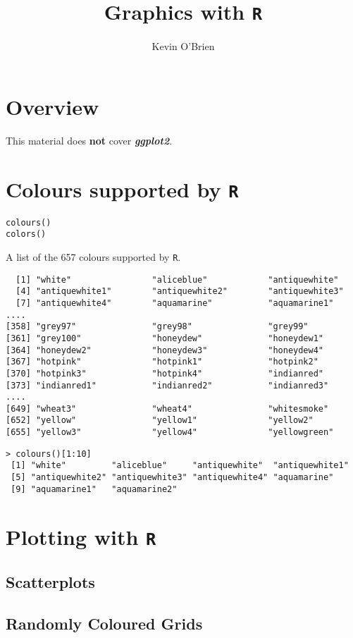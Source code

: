 \documentclass[11pt]{article} %
\title{Graphics with \texttt{R}}
\author{Kevin O'Brien}
\begin{document}
\section{Overview}
This material does \textbf{not} cover \textbf{\textit{ggplot2}}.
\section{Colours supported by \texttt{R}}
\begin{framed}
\begin{verbatim}
colours()
colors()
\end{verbatim}
\end{framed}
A list of the 657 colours supported by \texttt{R}.
\begin{verbatim}
  [1] "white"                "aliceblue"            "antiquewhite"        
  [4] "antiquewhite1"        "antiquewhite2"        "antiquewhite3"       
  [7] "antiquewhite4"        "aquamarine"           "aquamarine1"    
....
[358] "grey97"               "grey98"               "grey99"              
[361] "grey100"              "honeydew"             "honeydew1"           
[364] "honeydew2"            "honeydew3"            "honeydew4"           
[367] "hotpink"              "hotpink1"             "hotpink2"            
[370] "hotpink3"             "hotpink4"             "indianred"           
[373] "indianred1"           "indianred2"           "indianred3"                   
....
[649] "wheat3"               "wheat4"               "whitesmoke"          
[652] "yellow"               "yellow1"              "yellow2"             
[655] "yellow3"              "yellow4"              "yellowgreen"     
\end{verbatim}

\begin{verbatim}
> colours()[1:10]
 [1] "white"         "aliceblue"     "antiquewhite"  "antiquewhite1"
 [5] "antiquewhite2" "antiquewhite3" "antiquewhite4" "aquamarine"   
 [9] "aquamarine1"   "aquamarine2"
\end{verbatim}
\newpage
\section{Plotting with \texttt{R}}

\subsection{Scatterplots}


\subsection{Randomly Coloured Grids}
\end{document}
